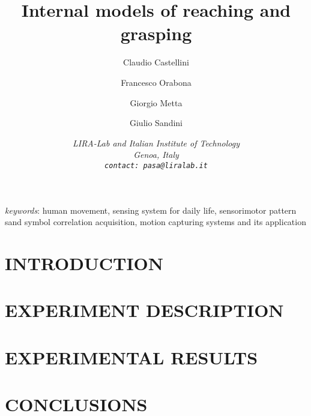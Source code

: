 \documentclass{arsubmit}
\title{Internal models of reaching and grasping}
\author{Claudio Castellini \and Francesco Orabona \and Giorgio Metta \and Giulio Sandini}
\date{\small \it{
LIRA-Lab and Italian Institute of Technology\\
Genoa, Italy\\
{\tt contact: pasa@liralab.it}
}}
\begin{document}
\maketitle

\begin{abstract}

\end{abstract}

{\it keywords}: human movement, sensing system for daily life,
sensorimotor pattern sand symbol correlation acquisition, motion
capturing systems and its application

\section{INTRODUCTION}
\label{sec:introduction}


\section{EXPERIMENT DESCRIPTION}
\label{sec:exp_desc}


\section{EXPERIMENTAL RESULTS}
\label{sec:exp_res}


\section{CONCLUSIONS}
\label{sec:Conclusions}


{\small


}
\end{document}
